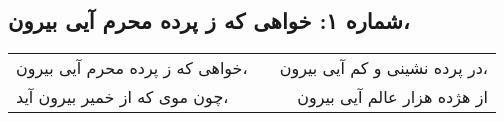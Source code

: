 \begin{center}
\section*{شماره ۱: خواهی که ز پرده محرم آیی بیرون،}
\label{sec:001}
\begin{longtable}{l p{0.5cm} r}
خواهی که ز پرده محرم آیی بیرون،
&&
در پرده نشینی و کم آیی بیرون،
\\
چون موی که از خمیر بیرون آید،
&&
از هژده هزار عالم آیی بیرون
\\
\end{longtable}
\end{center}
